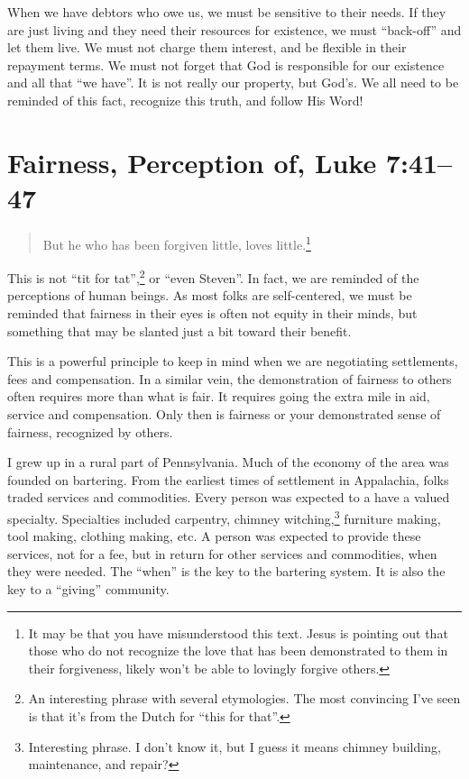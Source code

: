 \documentclass[12pt]{memoir}
\begin{document}
When we have debtors who owe us, we must be sensitive to their needs.
If they are just living and they need their resources for existence,
we must ``back-off'' and let them live. We must not charge them
interest, and be flexible in their repayment terms. We must not forget
that God is responsible for our existence and all that ``we have''.
It is not really our property, but God's. We all need to be reminded
of this fact, recognize this truth, and follow His Word!

\section[Fairness, Perception of]{Fairness, Perception of, Luke 7:41--47}

\begin{quote}
But he who has been forgiven little, loves little.\footnote{It may be that you have misunderstood this text. Jesus is pointing out that those who do not recognize the love that has been demonstrated to them in their forgiveness, likely won't be able to lovingly forgive others.}
\end{quote}

This is not ``tit for tat'',\footnote{An interesting phrase with several etymologies. The most convincing I've seen is that it's from the Dutch for ``this for that''.} or ``even Steven''. In fact, we are reminded of the perceptions of human beings. As most folks are self-centered, we must be reminded that fairness in their eyes is often not equity in their minds, but something that may be slanted just a bit toward their benefit.

This is a powerful principle to keep in mind when we are negotiating settlements, fees and compensation. In a similar vein, the demonstration of fairness to others often requires more than what is fair. It requires going the extra mile in aid, service and compensation. Only then is fairness or your demonstrated sense of fairness, recognized by others.

I grew up in a rural part of Pennsylvania. Much of the economy of
the area was founded on bartering. From the earliest times of settlement in Appalachia, folks traded services and commodities. Every
person was expected to a have a valued specialty. Specialties
included carpentry, chimney witching,\footnote{Interesting phrase. I don't know it, but I guess it means chimney building, maintenance, and repair?} furniture making, tool making,
clothing making, etc. A person was expected to provide these services,
not for a fee, but in return for other services and commodities, when
they were needed. The ``when'' is the key to the bartering system. It is also the key to a ``giving'' community. 
\end{document}
